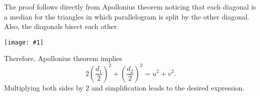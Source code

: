 \documentclass[12pt]{article}
\newcommand{\figura}[1]{\begin{center}\texttt{[image: \#1]}\end{center}}
\begin{document}
The proof follows directly from Apollonius theorem noticing that each diagonal 
is a median for the triangles in which parallelogram is split by the other diagonal.
 Also, the diagonals bisect each other.
\figura{parallelogramlaw}

Therefore, Apollonius theorem implies
$$2\left(\frac{d_1}{2}\right)^2 +\left(\frac{d_2}{2}\right)^2=u^2+v^2.$$
Multiplying both sides by $2$ and simplification leads to the desired expression.
\end{document}

